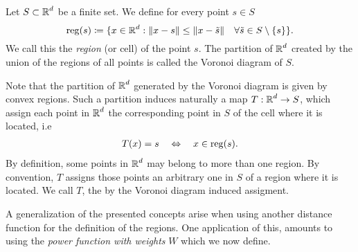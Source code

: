 \documentclass[
     12pt,         %
     a4paper,      %
     BCOR=10mm,     %
     DIV=14,        %
     ]{scrreprt}
\begin{document}
    \begin{defi}
        Let $S\subset \operatorname{\mathbb{R}}^d$ be a finite set.  We define for every point $s\in S$
        \[\operatorname{reg}(s) \coloneqq \{x \in \operatorname{\mathbb{R}}^d : \|x-s\| \le \|x-\tilde s \| \quad  \forall \tilde s \in S\setminus \{s\} \}. \]
        We call this the \textit{region} (or cell) of the point $s$.
        The partition of $\operatorname{\mathbb{R}}^d$ created by the union of the regions of all points is called the Voronoi diagram of $S$.
    \end{defi}
    \begin{rem}
        Note that the partition of $\operatorname{\mathbb{R}}^d$ generated by the Voronoi diagram is given by convex regions.  Such a partition induces naturally a map $T: \operatorname{\mathbb{R}}^d \to S$, which assign each point in $\operatorname{\mathbb{R}}^d$ the corresponding 
        point in $S$ of the cell where it is located, i.e
         \begin{align} \label{eq::reg}
             T(x) = s \quad \Leftrightarrow \quad x\in \operatorname{reg}(s).  
         \end{align}
         By definition, some points in $\operatorname{\mathbb{R}}^d$ may belong to more than one region.  By convention, $T$ assigns those points an arbitrary one in $S$ of a region
         where it is located. We call $T$, the by the Voronoi diagram induced assigment. 
    \end{rem}
    A generalization of the presented concepts arise when using another distance function for the definition of the regions. 
    One application of this, amounts to using the \textit{power function with weights} $W$ which we now define.
\end{document}
